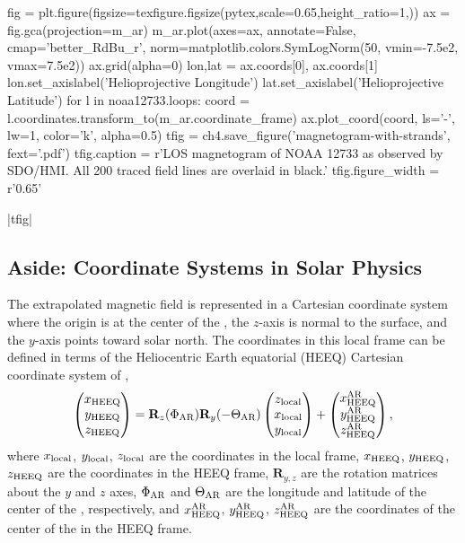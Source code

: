 \begin{pycode}[chapter4]
fig = plt.figure(figsize=texfigure.figsize(pytex,scale=0.65,height_ratio=1,))
ax = fig.gca(projection=m_ar)
m_ar.plot(axes=ax, annotate=False, cmap='better_RdBu_r',
          norm=matplotlib.colors.SymLogNorm(50, vmin=-7.5e2, vmax=7.5e2))
ax.grid(alpha=0)
lon,lat = ax.coords[0], ax.coords[1]
lon.set_axislabel('Helioprojective Longitude')
lat.set_axislabel('Helioprojective Latitude')
for l in noaa12733.loops:
    coord = l.coordinates.transform_to(m_ar.coordinate_frame)
    ax.plot_coord(coord, ls='-', lw=1, color='k', alpha=0.5)
tfig = ch4.save_figure('magnetogram-with-strands', fext='.pdf')
tfig.caption = r'LOS magnetogram of NOAA 12733 as observed by SDO/HMI. All 200 traced field lines are overlaid in black.'
tfig.figure_width = r'0.65\textwidth'
\end{pycode}
\py[chapter4]|tfig|

\subsection{Aside: Coordinate Systems in Solar Physics}\label{sec:coordinates}

The extrapolated magnetic field is represented in a Cartesian coordinate system where the origin is at the center of the \AR{}, the $z$-axis is normal to the surface, and the $y$-axis points toward solar north. The coordinates in this local \AR{} frame can be defined in terms of the Heliocentric Earth equatorial (HEEQ) Cartesian coordinate system of \citet{hapgood_space_1992},
\begin{equation}\label{eq:local_heeq_transform}
    \begin{pmatrix}x_\textup{HEEQ} \\ y_\textup{HEEQ} \\ z_\textup{HEEQ}\end{pmatrix}
    = \mathbf{R}_z(\Phi_\textup{AR})\mathbf{R}_y(-\Theta_\textup{AR})
    \begin{pmatrix}z_\textup{local} \\ x_\textup{local} \\ y_\textup{local}\end{pmatrix}
    + \begin{pmatrix}x^\textup{AR}_\textup{HEEQ} \\ y^\textup{AR}_\textup{HEEQ} \\ z^\textup{AR}_\textup{HEEQ}\end{pmatrix},
\end{equation}
where $x_\textup{local}$, $y_\textup{local}$, $z_\textup{local}$ are the coordinates in the local \AR{} frame, $x_\textup{HEEQ}$, $y_\textup{HEEQ}$, $z_\textup{HEEQ}$ are the coordinates in the HEEQ frame, $\mathbf{R}_{y,z}$ are the rotation matrices about the $y$ and $z$ axes, $\Phi_\textup{AR}$ and $\Theta_\textup{AR}$ are the longitude and latitude of the center of the \AR{}, respectively, and $x^\textup{AR}_\textup{HEEQ}$, $y^\textup{AR}_\textup{HEEQ}$, $z^\textup{AR}_\textup{HEEQ}$ are the coordinates of the center of the \AR{} in the HEEQ frame.

